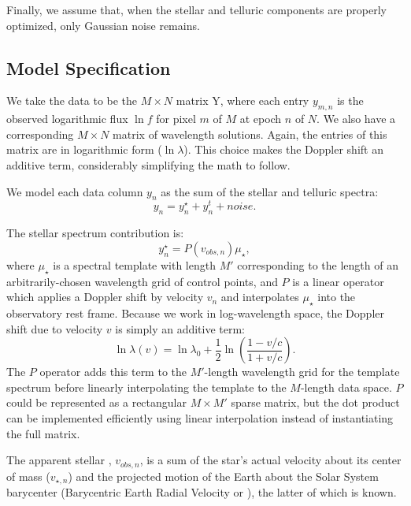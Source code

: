 \documentclass[modern]{aastex62}
\begin{document}
Finally, we assume that, when the stellar and telluric components are properly optimized, only Gaussian noise remains. 

\subsection{Model Specification}
\label{s:model-eqns}

We take the data to be the $M \times N$ matrix Y, where each entry $y_{m,n}$ is the observed logarithmic flux $\ln f$ for pixel $m$ of $M$ at epoch $n$ of $N$. 
We also have a corresponding $M \times N$ matrix of wavelength solutions. 
Again, the entries of this matrix are in logarithmic form ($\ln \lambda$). 
This choice makes the Doppler shift an additive term, considerably simplifying the math to follow.

We model each data column $y_n$ as the sum of the stellar and telluric spectra:
\begin{equation}
y_n = y_{n}^\star + y_{n}^t + noise.
\end{equation}

The stellar spectrum contribution is: 
\begin{equation}
y_{n}^\star = P(v_{obs, n}) \mu_{\star},
\label{eqn:star}
\end{equation}
where $\mu_{\star}$ is a spectral template with length $M'$ corresponding to
the length of an arbitrarily-chosen wavelength grid of control points, and
$P$ is a linear operator which applies a Doppler shift by velocity $v_n$ and
interpolates $\mu_\star$ into the observatory rest frame.
Because we work in log-wavelength space, the Doppler shift due to velocity $v$ is simply an additive term:
\begin{equation}
 \ln \lambda(v) = \ln \lambda_{0} + \frac{1}{2} \ln \left(\frac{1 - v/c}{1 + v/c}\right).
\end{equation}
The $P$ operator adds this term to the $M'$-length wavelength grid for the template spectrum before linearly interpolating the template to the $M$-length data space.
$P$ could be represented as a rectangular $M \times M'$ sparse matrix, but the dot product can be implemented efficiently using linear interpolation instead of instantiating the full matrix.

The apparent stellar \RV, $v_{obs, n}$, is a sum of the star's actual velocity about its center of mass ($v_{\star, n}$) and the projected motion of the Earth about the Solar System barycenter (Barycentric Earth Radial Velocity or \BERV), the latter of which is known.
\end{document}
